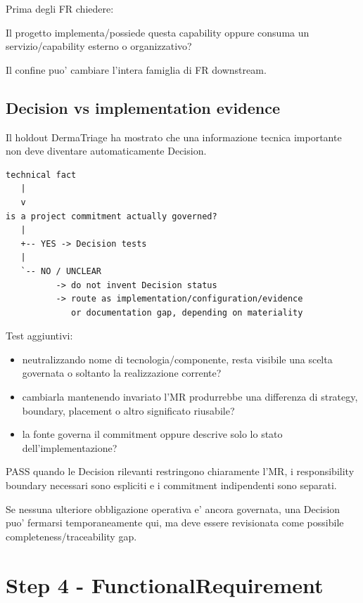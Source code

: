 \documentclass[11pt,a4paper]{article}
\begin{document}
Prima degli FR chiedere:
\begin{ddtacheck}
Il progetto implementa/possiede questa capability oppure consuma un servizio/capability esterno o organizzativo?
\end{ddtacheck}

Il confine puo' cambiare l'intera famiglia di FR downstream.

\subsection{Decision vs implementation evidence}
\holdouttag

Il holdout DermaTriage ha mostrato che una informazione tecnica importante non deve diventare automaticamente Decision.

\begin{lstlisting}
technical fact
   |
   v
is a project commitment actually governed?
   |
   +-- YES -> Decision tests
   |
   `-- NO / UNCLEAR
          -> do not invent Decision status
          -> route as implementation/configuration/evidence
             or documentation gap, depending on materiality
\end{lstlisting}

Test aggiuntivi:
\begin{itemize}
  \item neutralizzando nome di tecnologia/componente, resta visibile una scelta governata o soltanto la realizzazione corrente?
  \item cambiarla mantenendo invariato l'MR produrrebbe una differenza di strategy, boundary, placement o altro significato riusabile?
  \item la fonte governa il commitment oppure descrive solo lo stato dell'implementazione?
\end{itemize}

\begin{ddtacheck}[title={Gate D2 - Decision + STOP}]
PASS quando le Decision rilevanti restringono chiaramente l'MR, i responsibility boundary necessari sono espliciti e i commitment indipendenti sono separati.

Se nessuna ulteriore obbligazione operativa e' ancora governata, una Decision puo' fermarsi temporaneamente qui, ma deve essere revisionata come possibile completeness/traceability gap.
\end{ddtacheck}

\section{Step 4 - FunctionalRequirement}
\closedtag
\end{document}
